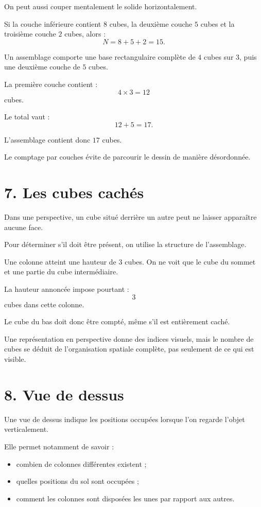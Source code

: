 On peut aussi couper mentalement le solide horizontalement.

Si la couche inférieure contient $8$ cubes, la deuxième couche $5$ cubes et la troisième couche $2$ cubes, alors :
\[
N=8+5+2=15.
\]

\begin{exemple}
Un assemblage comporte une base rectangulaire complète de $4$ cubes sur $3$, puis une deuxième couche de $5$ cubes.

La première couche contient :
\[
4\times3=12
\]
cubes.

Le total vaut :
\[
12+5=17.
\]

L'assemblage contient donc $\boxed{17}$ cubes.
\end{exemple}

Le comptage par couches évite de parcourir le dessin de manière désordonnée.

\section{7. Les cubes cachés}

Dans une perspective, un cube situé derrière un autre peut ne laisser apparaître aucune face.

Pour déterminer s'il doit être présent, on utilise la structure de l'assemblage.

\begin{exemple}
Une colonne atteint une hauteur de $3$ cubes. On ne voit que le cube du sommet et une partie du cube intermédiaire.

La hauteur annoncée impose pourtant :
\[
3
\]
cubes dans cette colonne.

Le cube du bas doit donc être compté, même s'il est entièrement caché.
\end{exemple}

\begin{propriete}
Une représentation en perspective donne des indices visuels, mais le nombre de cubes se déduit de l'organisation spatiale complète, pas seulement de ce qui est visible.
\end{propriete}

\section{8. Vue de dessus}

Une vue de dessus indique les positions occupées lorsque l'on regarde l'objet verticalement.

Elle permet notamment de savoir :
\begin{itemize}
\item combien de colonnes différentes existent ;
\item quelles positions du sol sont occupées ;
\item comment les colonnes sont disposées les unes par rapport aux autres.
\end{itemize}

